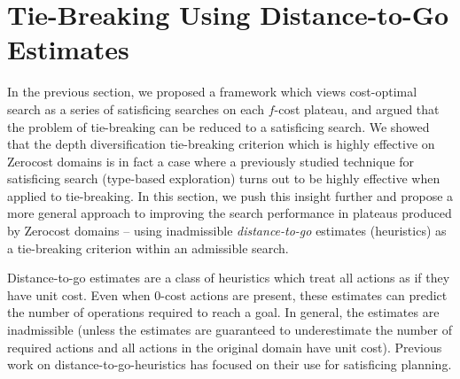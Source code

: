 \section{Tie-Breaking Using Distance-to-Go Estimates}

\label{sec:distance-to-go}
In the previous section, we proposed a framework which views cost-optimal \astar search as a series of satisficing searches on each $f$-cost plateau, and argued that 
the problem of tie-breaking can be reduced to a satisficing search.
We showed that the depth diversification tie-breaking criterion which is highly effective on Zerocost domains is in fact a case where a previously studied technique for satisficing search (type-based exploration) turns out to be highly effective when applied to tie-breaking.
In this section, we push this insight further and propose a more general approach to improving the
search performance in plateaus produced by Zerocost domains --
using inadmissible \emph{distance-to-go} estimates (heuristics) as a tie-breaking criterion within an admissible \astar search.



Distance-to-go estimates are a class of
heuristics which treat all actions as if they have unit cost. Even 
when 0-cost actions are present, these estimates can predict the
number of operations required to reach a goal.
In general, the estimates are inadmissible (unless the estimates are guaranteed to underestimate the number of required actions and all actions in the original domain have unit cost).
Previous work on distance-to-go-heuristics has focused on 
their use for satisficing planning.


